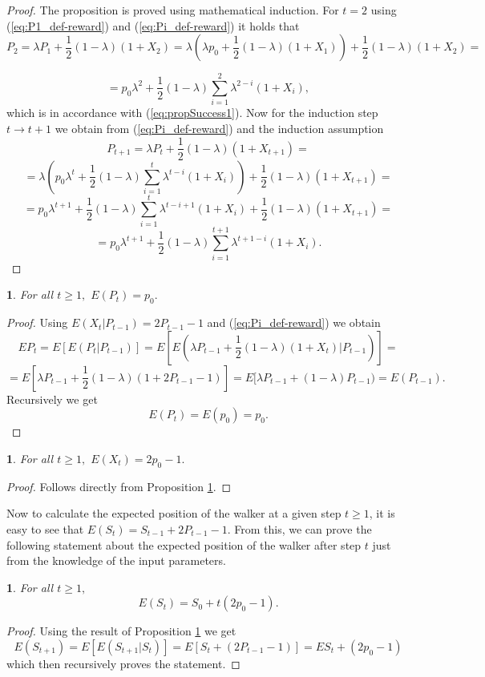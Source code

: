 \documentclass{amsart}
\theoremstyle{definition}
\theoremstyle{plain}
\newtheorem{prop}[thm]{\protect\propositionname}
\theoremstyle{plain}
\numberwithin{equation}{section}
\providecommand{\propositionname}{Proposition}
\begin{document}
\begin{proof}
The proposition is proved using mathematical induction. For $t=2$ using (\ref{eq:P1_def-reward})
and (\ref{eq:Pi_def-reward}) it holds that
\[
P_{2}=\lambda P_{1}+\frac{1}{2}(1-\lambda)(1+X_{2})=\lambda(\lambda p_{0}+\frac{1}{2}(1-\lambda)(1+X_{1}))+\frac{1}{2}(1-\lambda)(1+X_{2})=
\]

\[
=p_{0}\lambda^{2}+\frac{1}{2}(1-\lambda)\sum_{i=1}^{2}\lambda^{2-i}(1+X_{i}),
\]
which is in accordance with (\ref{eq:propSuccess1}). Now for the
induction step $t\rightarrow t+1$ we obtain from (\ref{eq:Pi_def-reward})
and the induction assumption
\[
P_{t+1}=\lambda P_{t}+\frac{1}{2}(1-\lambda)(1+X_{t+1})=
\]
\[
=\lambda(p_{0}\lambda^{t}+\frac{1}{2}(1-\lambda)\sum_{i=1}^{t}\lambda^{t-i}(1+X_{i}))+\frac{1}{2}(1-\lambda)(1+X_{t+1})=
\]
\[
=p_{0}\lambda^{t+1}+\frac{1}{2}(1-\lambda)\sum_{i=1}^{t}\lambda^{t-i+1}(1+X_{i})+\frac{1}{2}(1-\lambda)(1+X_{t+1})=
\]
\[
=p_{0}\lambda^{t+1}+\frac{1}{2}(1-\lambda)\sum_{i=1}^{t+1}\lambda^{t+1-i}(1+X_{i}).
\]
\end{proof}

\begin{prop}
\label{PropReward2}For all $t\geq1,$ $E(P_{t})=p_{0}.$
\end{prop}
\begin{proof}
Using $E(X_{t}|P_{t-1})=2P_{t-1}-1$ and (\ref{eq:Pi_def-reward})
we obtain
\[
EP_{t}=E[E(P_{t}|P_{t-1})]=E[E(\lambda P_{t-1}+\frac{1}{2}(1-\lambda)(1+X_{t})|P_{t-1})]=
\]
\[
=E[\lambda P_{t-1}+\frac{1}{2}(1-\lambda)(1+2P_{t-1}-1)]=E[\lambda P_{t-1}+(1-\lambda)P_{t-1})=  E(P_{t-1}).
\]
Recursively we get 
\begin{equation}
E(P_{t})=E(p_{0})=p_{0}.\label{eq:EPt-reward-formula}
\end{equation}
\end{proof}

\begin{prop}
For all $t\geq1,$ $E(X_{t})=2p_{0}-1.$
\end{prop}
\begin{proof}
Follows directly from Proposition \ref{PropReward2}.
\end{proof}

Now to calculate the expected position of the walker at a given step
$t\geq1$, it is easy to see that $E(S_{t})=S_{t-1}+2P_{t-1}-1$.
From this, we can prove the following statement about the expected
position of the walker after step $t$ just from the knowledge of
the input parameters.

\begin{prop}
For all $t\geq1,$ 
\[
E(S_{t})=S_{0}+t(2p_{0}-1).
\]
\end{prop}
\begin{proof}
Using the result of Proposition \ref{PropReward2} we get 
\[
E(S_{t+1})=E[E(S_{t+1}|S_{t})]=E[S_{t}+(2P_{t-1}-1)]=
ES_{t}+(2p_{0}-1)
\]
which then recursively proves the statement.
\end{proof}
\end{document}
